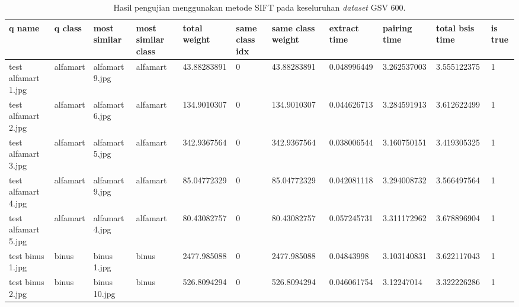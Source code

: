 \begin{landscape}
	\begin{longtable}{|p{2cm}|p{1.5cm}|p{2cm}|p{1.5cm}|p{2cm}|p{1cm}|p{2cm}|p{2cm}|p{2cm}|p{2cm}|p{1cm}|}
		\caption{Hasil pengujian menggunakan metode SIFT pada keseluruhan \textit{dataset} GSV 600.} \\
		\hline
		\textbf{q name}      & \textbf{q class} & \textbf{most similar} & \textbf{most similar class} & \textbf{total weight} & \textbf{same class idx} & \textbf{same class weight} & \textbf{extract time} & \textbf{pairing time} & \textbf{total bsis time} & \textbf{is true} \\ \hline
		test alfamart 1.jpg  & alfamart         & alfamart 9.jpg        & alfamart                    & 43.88283891           & 0                       & 43.88283891                & 0.048996449           & 3.262537003           & 3.555122375              & 1                \\ \hline
		test alfamart 2.jpg  & alfamart         & alfamart 6.jpg        & alfamart                    & 134.9010307           & 0                       & 134.9010307                & 0.044626713           & 3.284591913           & 3.612622499              & 1                \\ \hline
		test alfamart 3.jpg  & alfamart         & alfamart 5.jpg        & alfamart                    & 342.9367564           & 0                       & 342.9367564                & 0.038006544           & 3.160750151           & 3.419305325              & 1                \\ \hline
		test alfamart 4.jpg  & alfamart         & alfamart 9.jpg        & alfamart                    & 85.04772329           & 0                       & 85.04772329                & 0.042081118           & 3.294008732           & 3.566497564              & 1                \\ \hline
		test alfamart 5.jpg  & alfamart         & alfamart 4.jpg        & alfamart                    & 80.43082757           & 0                       & 80.43082757                & 0.057245731           & 3.311172962           & 3.678896904              & 1                \\ \hline
		test binus 1.jpg     & binus            & binus 1.jpg           & binus                       & 2477.985088           & 0                       & 2477.985088                & 0.04843998            & 3.103140831           & 3.622117043              & 1                \\ \hline
		test binus 2.jpg     & binus            & binus 10.jpg          & binus                       & 526.8094294           & 0                       & 526.8094294                & 0.046061754           & 3.12247014            & 3.322226286              & 1                \\ \hline

\end{longtable}
\end{landscape}
